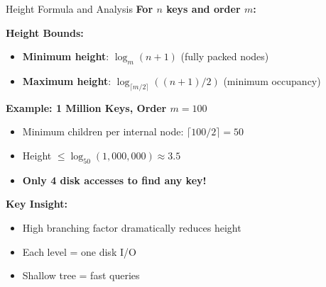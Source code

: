 \documentclass[aspectratio=169]{beamer}
\begin{document}
\begin{frame}{Height Formula and Analysis}
  \textbf{For $n$ keys and order $m$:}

  \vspace{0.3cm}
  \textbf{Height Bounds:}
  \begin{itemize}
    \item \textbf{Minimum height}: $\log_m(n+1)$ (fully packed nodes)
    \item \textbf{Maximum height}: $\log_{\lceil m/2 \rceil}((n+1)/2)$ (minimum occupancy)
  \end{itemize}

  \vspace{0.3cm}
  \textbf{Example: 1 Million Keys, Order $m=100$}
  \begin{itemize}
    \item Minimum children per internal node: $\lceil 100/2 \rceil = 50$
    \item Height $\leq \log_{50}(1,000,000) \approx 3.5$
    \item \textbf{Only 4 disk accesses to find any key!}
  \end{itemize}

  \vspace{0.3cm}
  \textbf{Key Insight:}
  \begin{itemize}
    \item High branching factor dramatically reduces height
    \item Each level = one disk I/O
    \item Shallow tree = fast queries
  \end{itemize}
\end{frame}
\end{document}
